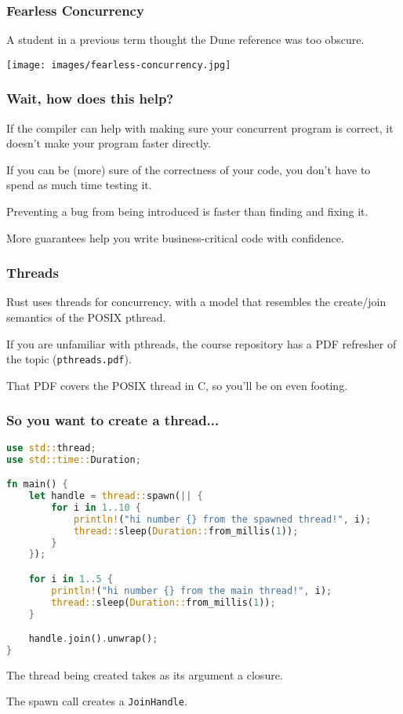 \begin{frame}
\frametitle{Fearless Concurrency}

A student in a previous term thought the Dune reference was too obscure.

\begin{center}
	\texttt{[image: images/fearless-concurrency.jpg]}
\end{center}

\end{frame}


\begin{frame}
\frametitle{Wait, how does this help?}

If the compiler can help with making sure your concurrent program is correct, it doesn't make your program faster directly.

If you can be (more) sure of the correctness of your code, you don't have to spend as much time testing it.

Preventing a bug from being introduced is faster than finding and fixing it.

More guarantees help you write business-critical code with confidence.

\end{frame}


\begin{frame}
\frametitle{Threads}

Rust uses threads for concurrency, with a model that resembles the create/join semantics of the POSIX pthread. 

If you are unfamiliar with pthreads, the course repository has a PDF refresher of the topic (\texttt{pthreads.pdf}).

That PDF covers the POSIX thread in C, so you'll be on even footing.

\end{frame}


\begin{frame}[fragile]
\frametitle{So you want to create a thread...}

\begin{lstlisting}[language=Rust]
use std::thread;
use std::time::Duration;

fn main() {
    let handle = thread::spawn(|| {
        for i in 1..10 {
            println!("hi number {} from the spawned thread!", i);
            thread::sleep(Duration::from_millis(1));
        }
    });

    for i in 1..5 {
        println!("hi number {} from the main thread!", i);
        thread::sleep(Duration::from_millis(1));
    }

    handle.join().unwrap();
}
\end{lstlisting}

The thread being created takes as its argument a \alert{closure}.


The spawn call creates a \texttt{JoinHandle}.
\end{frame}


